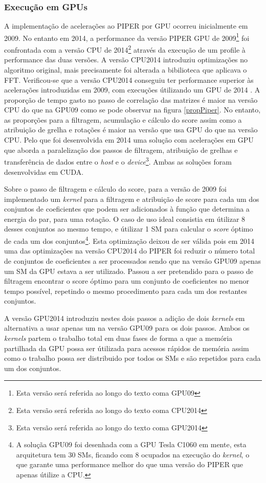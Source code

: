  \subsubsection{Execução em GPUs}
 A implementação de acelerações ao PIPER\cite{piper2009gpu} por GPU ocorreu inicialmente em 2009. No entanto em 2014, a performance da versão PIPER GPU de 2009\footnote[6]{Esta versão será referida ao longo do texto coma GPU09} foi confrontada com a versão CPU de 2014\footnote[7]{Esta versão será referida ao longo do texto coma CPU2014} através da execução de um profile à performance das duas versões. A versão CPU2014 introduziu optimizações no algoritmo original, mais precisamente foi alterada a bibilioteca que aplicava o FFT. Verificou-se que a versão CPU2014 conseguiu ter performance superior às acelerações introduzidas em 2009, com execuções útilizando um GPU de 2014 \cite{piper2014gpu}. A proporção de tempo gasto no passo de correlação das matrizes é maior na versão CPU do que na GPU09 como se pode observar na figura \ref{propPiper}. No entanto, as proporções para a filtragem, acumulação e cálculo do score assim como a atribuição de grelha e rotações é maior na versão que usa GPU do que na versão CPU. Pelo que foi desenvolvida em 2014  uma solução com acelerações em GPU que aborda a paralelização dos passos de filtragem, atribuição de grelhas e transferência de dados entre o \textit{host} e o \textit{device}\footnote[8]{Esta versão será referida ao longo do texto coma GPU2014}. Ambas as soluções foram desenvolvidas em CUDA. \par
 Sobre o passo de filtragem e cálculo do score, para a versão de 2009 foi implementado um \textit{kernel} para a filtragem e atribuição de score para cada um dos conjuntos de coeficientes que podem ser adicionados à função que determina a energia do par, para uma rotação. O caso de uso ideal consistia em útilizar 8 desses conjuntos ao mesmo tempo, e útilizar 1 SM para calcular o \textit{score} óptimo de cada um dos conjuntos\footnote[9]{A soluçãa GPU09 foi desenhada com a GPU Tesla C1060 em mente, esta arquitetura tem 30 SMs, ficando com 8 ocupados na execução do \textit{kernel}, o que garante uma performance melhor do que uma versão do PIPER que apenas útilize a CPU.}. Esta optimização deixou de ser válida pois em 2014 uma das optimizações na versão CPU2014 do PIPER foi reduzir o número total de conjuntos de coeficientes a ser processados sendo que na versão GPU09 apenas um SM da GPU estava a ser utilizado. Passou a ser pretendido para o passo de filtragem encontrar o score óptimo para um conjunto de coeficientes no menor tempo possível, repetindo o mesmo procedimento para cada um dos restantes conjuntos.\par A versão GPU2014 introduziu nestes dois passos a adição de dois \textit{kernels} em alternativa a usar apenas um na versão GPU09 para os dois passos. Ambos os \textit{kernels} partem o trabalho total em duas fases de forma a que a memória partilhada da GPU possa ser útilizada para acessos rápidos de memória assim como o trabalho possa ser distribuido por todos os SMs e são repetidos para cada um dos conjuntos. \par
